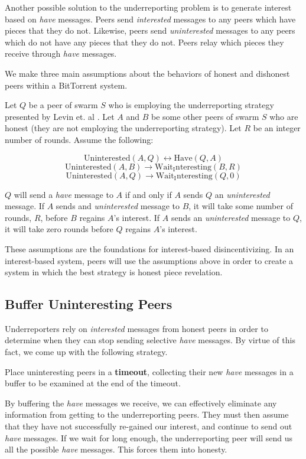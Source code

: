 Another possible solution to the underreporting problem is to generate interest based on \textit{have} messages. Peers send \textit{interested} messages to any peers which have pieces that they do not. Likewise, peers send \textit{uninterested} messages to any peers which do not have any pieces that they do not. Peers relay which pieces they receive through \textit{have} messages.

We make three main assumptions about the behaviors of honest and dishonest peers within a BitTorrent system.

Let $Q$ be a peer of swarm $S$ who is employing the underreporting strategy presented by Levin et. al \cite{dlbittorrent}. Let $A$ and $B$ be some other peers of swarm $S$ who are honest (they are not employing the underreporting strategy). Let $R$ be an integer number of rounds. Assume the following:

$$ \mathrm{Uninterested}(A, Q) \longleftrightarrow \mathrm{Have}(Q, A) $$
$$ \mathrm{Uninterested}(A, B) \longrightarrow \mathrm{Wait_Interesting}(B, R) $$
$$ \mathrm{Uninterested}(A, Q) \longrightarrow \mathrm{Wait_Interesting}(Q, 0) $$\newline

$Q$ will send a \textit{have} message to $A$ if and only if $A$ sends $Q$ an \textit{uninterested} message. If $A$ sends and \textit{uninterested} message to $B$, it will take some number of rounds, $R$, before $B$ regains $A$'s interest. If $A$ sends an \textit{uninterested} message to $Q$, it will take zero rounds before $Q$ regains $A$'s interest.

These assumptions are the foundations for interest-based disincentivizing. In an interest-based system, peers will use the assumptions above in order to create a system in which the best strategy is honest piece revelation.

\subsection{Buffer Uninteresting Peers}

Underreporters rely on \textit{interested} messages from honest peers in order to determine when they can stop sending selective \textit{have} messages. By virtue of this fact, we come up with the following strategy.

Place uninteresting peers in a \textbf{timeout}, collecting their new \textit{have} messages in a buffer to be examined at the end of the timeout.

By buffering the \textit{have} messages we receive, we can effectively eliminate any information from getting to the underreporting peers. They must then assume that they have not successfully re-gained our interest, and continue to send out \textit{have} messages. If we wait for long enough, the underreporting peer will send us all the possible \textit{have} messages. This forces them into honesty.

